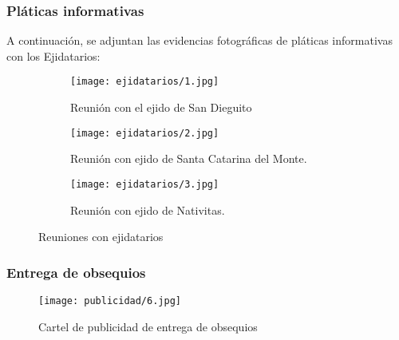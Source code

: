 \subsubsection{Pláticas informativas}

A continuación, se adjuntan las evidencias fotográficas de pláticas informativas con los Ejidatarios:


\begin{figure}[h!]
	\centering
	\begin{subfigure} 
		\centering
		\texttt{[image: ejidatarios/1.jpg]}
		\caption{Reunión con el ejido de San Dieguito}
		\label{ejidatarios1}
	\end{subfigure} 
	\begin{subfigure} 
		\centering
		\texttt{[image: ejidatarios/2.jpg]}
		\caption{Reunión con ejido de Santa Catarina del Monte.}
		\label{ejidatarios2}
	\end{subfigure}
	\begin{subfigure} 
		\centering
		\texttt{[image: ejidatarios/3.jpg]}
		\caption{Reunión con ejido de Nativitas.}
		\label{ejidatarios3}
	\end{subfigure}
	\caption{Reuniones con ejidatarios}
	\label{ejidatarios123}
\end{figure}


\subsubsection{Entrega de obsequios}

\begin{figure}[h!]
\centering
  \texttt{[image: publicidad/6.jpg]}
  \caption{Cartel de publicidad de entrega de obsequios}
  \label{publicidad6}
\end{figure}



